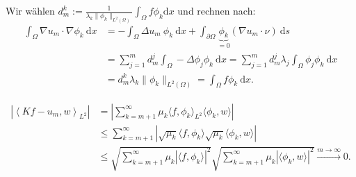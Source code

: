 \begin{solution}

  Wir wählen $d_m^k := \frac{1}{\lambda_k \|\phi_k\|_{L^2(\Omega)}} \int_\Omega f \phi_k \mathrm{d}x$ und rechnen nach:
  \begin{align*}
  \int_\Omega \nabla u_m \cdot \nabla \phi_k \mathrm{~d}x
  &= -\int_\Omega \Delta u_m~\phi_k \mathrm{~d}x + \int_{\partial\Omega} \underbrace{\phi_k}_{= 0} (\nabla u_m \cdot \nu) \mathrm{~d}s\\
  &= \sum_{j = 1}^m d_m^j \int_\Omega -\Delta \phi_j \phi_k \mathrm{~d}x
  = \sum_{j = 1}^m d_m^j \lambda_j \int_\Omega \phi_j \phi_k \mathrm{~d}x\\
  &= d_m^k \lambda_k \|\phi_k\|_{L^2(\Omega)} = \int_\Omega f \phi_k \mathrm{~d}x.
  \end{align*}

  \begin{align*} %
      \left| \left\langle Kf - u_m, w \right\rangle_{L^2} \right|
      &= \left| \sum_{k = m+1}^\infty \mu_k \langle f, \phi_k\rangle_{L^2} \langle \phi_k, w \rangle \right|\\
      &\leq \sum_{k = m+1}^\infty \left| \sqrt{\mu_k} \langle f, \phi_k \rangle \sqrt{\mu_k} \langle \phi_k, w \rangle \right|\\
      &\leq \sqrt{ \sum_{k = m+1}^\infty \mu_k |\langle f, \phi_k \rangle|^2} \sqrt{ \sum_{k = m+1}^\infty \mu_k |\langle \phi_k, w \rangle|^2} \xrightarrow{m \rightarrow \infty} 0.
  \end{align*}


\end{solution}
